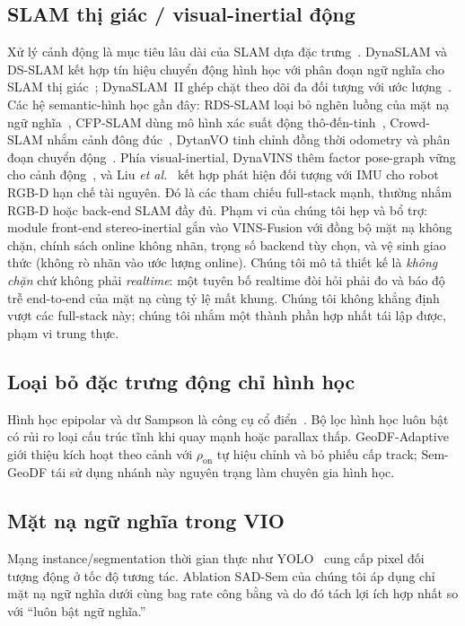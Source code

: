 \documentclass{ieeeaccess}
\begin{document}
\subsection{SLAM thị giác / visual-inertial động}
Xử lý cảnh động là mục tiêu lâu dài của SLAM dựa đặc trưng~\cite{cadena2016survey}.
DynaSLAM và DS-SLAM kết hợp tín hiệu chuyển động hình học với phân đoạn ngữ nghĩa cho SLAM thị giác~\cite{bescos2018dynaslam,yu2018dsslam}; DynaSLAM~II ghép chặt theo dõi đa đối tượng với ước lượng~\cite{bescos2021dynaslam2}.
Các hệ semantic-hình học gần đây: RDS-SLAM loại bỏ nghẽn luồng của mặt nạ ngữ nghĩa~\cite{zhang2020rdsslam}, CFP-SLAM dùng mô hình xác suất động thô-đến-tinh~\cite{hu2023cfpslam}, Crowd-SLAM nhắm cảnh đông đúc~\cite{soares2021crowd}, DytanVO tinh chỉnh đồng thời odometry và phân đoạn chuyển động~\cite{shen2023dytanvo}.
Phía visual-inertial, DynaVINS thêm factor pose-graph vững cho cảnh động~\cite{song2022dynavins}, và Liu \emph{et al.}~\cite{liu2022dynamicvins} kết hợp phát hiện đối tượng với IMU cho robot RGB-D hạn chế tài nguyên.
Đó là các tham chiếu full-stack mạnh, thường nhắm RGB-D hoặc back-end SLAM đầy đủ.
Phạm vi của chúng tôi hẹp và bổ trợ: module front-end stereo-inertial gắn vào VINS-Fusion với đồng bộ mặt nạ không chặn, chính sách online không nhãn, trọng số backend tùy chọn, và vệ sinh giao thức (không rò nhãn vào ước lượng online). Chúng tôi mô tả thiết kế là \emph{không chặn} chứ không phải \emph{realtime}: một tuyên bố realtime đòi hỏi phải đo và báo độ trễ end-to-end của mặt nạ cùng tỷ lệ mất khung.
Chúng tôi không khẳng định vượt các full-stack này; chúng tôi nhắm một thành phần hợp nhất tái lập được, phạm vi trung thực.

\subsection{Loại bỏ đặc trưng động chỉ hình học}
Hình học epipolar và dư Sampson là công cụ cổ điển~\cite{hartley2003multiple}.
Bộ lọc hình học luôn bật có rủi ro loại cấu trúc tĩnh khi quay mạnh hoặc parallax thấp.
GeoDF-Adaptive giới thiệu kích hoạt theo cảnh với \(\rho_{\mathrm{on}}\) tự hiệu chỉnh và bỏ phiếu cấp track; Sem-GeoDF tái sử dụng nhánh này nguyên trạng làm chuyên gia hình học.

\subsection{Mặt nạ ngữ nghĩa trong VIO}
Mạng instance/segmentation thời gian thực như YOLO~\cite{redmon2016yolo,jocher2023yolo} cung cấp pixel đối tượng động ở tốc độ tương tác.
Ablation SAD-Sem của chúng tôi áp dụng chỉ mặt nạ ngữ nghĩa dưới cùng bag rate công bằng và do đó tách lợi ích hợp nhất so với ``luôn bật ngữ nghĩa.''
\end{document}

